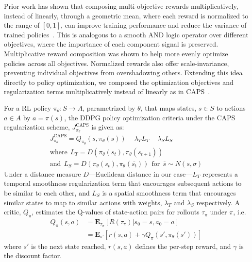 \documentclass[letterpaper, 10 pt, conference]{ieeeconf} %
\begin{document}
        Prior work has shown that composing multi-objective rewards multiplicatively, instead of linearly, through a geometric mean, where each reward is normalized to the range of $[0,1]$, can improve training performance and reduce the variance of trained policies~\cite{mysore2021train}.
        This is analogous to a smooth AND logic operator over different objectives, where the importance of each component signal is preserved. 
        Multiplicative reward composition was shown to help more evenly optimize policies across all objectives.
        Normalized rewards also offer scale-invariance, preventing individual objectives from overshadowing others.
        Extending this idea directly to policy optimization, we composed the optimization objectives and regularization terms multiplicatively instead of linearly as in CAPS~\cite{mysore2021caps}.
        
        For a RL policy $\pi_\theta: S \rightarrow A$, parametrized by $\theta$, that maps states, $s \in S$ to actions $a \in A$ by $a = \pi(s)$, the DDPG policy optimization criteria under the CAPS regularization scheme, $J_{\pi_\theta}^{\text{CAPS}}$ is given as:
        \begin{gather}
            J_{\pi_\theta}^{\text{CAPS}} = Q_{\pi_\theta}(s,\pi_\theta(s)) - \lambda_T L_T - \lambda_S L_S \\
            \text{where} \ \ L_T = D\left({\pi_\theta}(s_t), {\pi_\theta}(s_{t+1})\right) \nonumber \\ 
            \text{and} \ \ L_S = D\left({\pi_\theta}(s_t), {\pi_\theta}(\bar{s_t})\right)\ \ \text{for} \ \  \bar{s} \sim N(s,\sigma)  \nonumber
        \end{gather}
        Under a distance measure $D$---Euclidean distance in our case---$L_T$ represents a temporal smoothness regularization term that encourages subsequent actions to be similar to each other, and $L_S$ is a spatial smoothness term that encourages similar states to map to similar actions with weights, $\lambda_T$ and $\lambda_S$ respectively.
        A critic, $Q_{\pi}$, estimates the Q-values of state-action pairs for rollouts $\tau_\pi$ under $\pi$, i.e.
        \begin{align*}
            Q_\pi(s,a) &= \mathbf{E}_{\tau_{\pi}}[R(\tau_{\pi}) | s_0 = s, a_0 = a] \\
            &= \mathbf{E}_{s'} [r(s,a) + \gamma Q_{\pi} (s',\pi_\theta(s'))]
        \end{align*}
        where $s'$ is the next state reached, $r(s,a)$ defines the per-step reward, and $\gamma$ is the discount factor.
\end{document}
